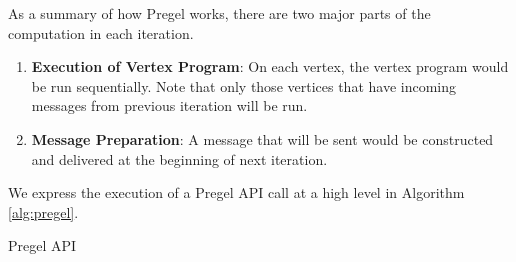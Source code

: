 %
As a summary of how Pregel works, there are two major parts of the computation in each iteration.
%
\begin{enumerate}
%
\item \textbf{Execution of Vertex Program}: 
%
On each vertex, the vertex program would be run sequentially.
%
Note that only those vertices that have incoming messages from previous iteration will be run.
%
\item \textbf{Message Preparation}:
%
A message that will be sent would be constructed and delivered at the beginning of next iteration.
%
\end{enumerate}
%
We express the execution of a Pregel API call at a high level in Algorithm \ref{alg:pregel}.
%
\begin{algorithm} 
  \SetAlgoLined
  \caption{Pregel API}
  \label{alg:pregel}
\end{algorithm}
%

